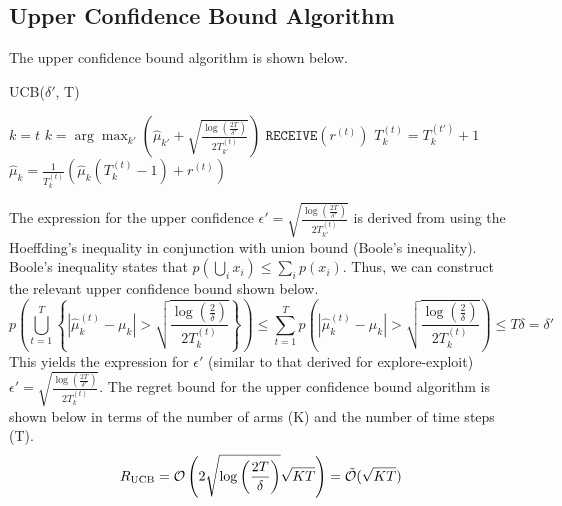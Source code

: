 \documentclass[11pt]{article}
\begin{document}
\subsection{Upper Confidence Bound Algorithm}
The upper confidence bound algorithm is shown below.
\begin{algorithm}[H]
\caption{UCB($\delta'$, T)}
\begin{algorithmic}[1]
    \STATE $k=t$
    \ELSE
    \STATE $k = \arg\max_{k'} \left(\hat{\mu}_{k'} + \sqrt{\frac{\log{(\frac{2T}{\delta'})}}{2T_{k'}^{(t)}}}\right)$
    \ENDIF
    \STATE $\texttt{RECEIVE}(r^{(t)})$
    \STATE $T_k^{(t)} = T_k^{(t')} + 1$
    \STATE $\hat{\mu}_k = \frac{1}{T_k^{(t)}}\left( \hat{\mu}_k(T_k^{(t)} - 1) + r^{(t)} \right)$
\ENDFOR
\end{algorithmic}
\end{algorithm}
The expression for the upper confidence $\epsilon' = \sqrt{\frac{\log{(\frac{2T}{\delta'})}}{2T_{k'}^{(t)}}}$ is derived from using the Hoeffding's inequality in conjunction with union bound (Boole's inequality). Boole's inequality states that $p(\bigcup_i x_i) \leq \sum_i p(x_i)$. Thus, we can construct the relevant upper confidence bound shown below.
\[ p\left(\bigcup_{t=1}^T\left\{|\hat{\mu}_k^{(t)} - \mu_k| > \sqrt{\frac{\log{(\frac{2}{\delta})}}{2T_k^{(t)}}}\right\}\right) \leq \sum_{t=1}^T p\left( |\hat{\mu}_k^{(t)} - \mu_k| > \sqrt{\frac{\log{(\frac{2}{\delta})}}{2T_k^{(t)}}} \right) \leq T\delta = \delta' \]
This yields the expression for $\epsilon'$ (similar to that derived for explore-exploit) $\epsilon' = \sqrt{\frac{\log{(\frac{2T}{\delta'})}}{2T_k^{(t)}}}$.
The regret bound for the upper confidence bound algorithm is shown below in terms of the number of arms (K) and the number of time steps (T).
\[ R_{\text{UCB}} = \mathcal{O}\left(2\sqrt{\log{\left(\frac{2T}{\delta}\right)}}\sqrt{KT}\right) =  \mathcal{\Tilde{O}}(\sqrt{KT}) \]

\end{document}
